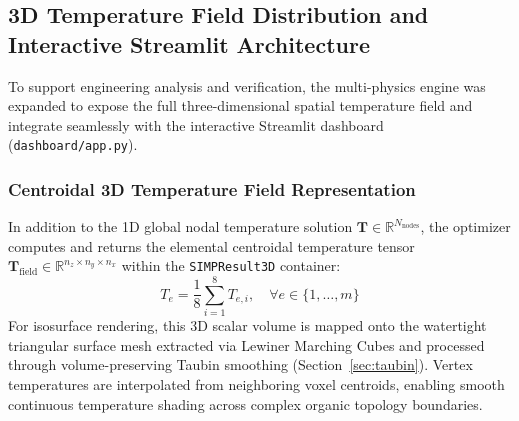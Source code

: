 \documentclass[11pt, a4paper]{article}
\begin{document}
\subsection{3D Temperature Field Distribution and Interactive Streamlit Architecture}
\label{sec:viz_arch}
To support engineering analysis and verification, the multi-physics engine was expanded to expose the full three-dimensional spatial temperature field and integrate seamlessly with the interactive Streamlit dashboard (\texttt{dashboard/app.py}).

\subsubsection{Centroidal 3D Temperature Field Representation}
In addition to the 1D global nodal temperature solution $\mathbf{T} \in \mathbb{R}^{N_{\text{nodes}}}$, the optimizer computes and returns the elemental centroidal temperature tensor $\mathbf{T}_{\text{field}} \in \mathbb{R}^{n_z \times n_y \times n_x}$ within the \texttt{SIMPResult3D} container:
\begin{equation}
T_e = \frac{1}{8} \sum_{i=1}^8 T_{e, i}, \quad \forall e \in \{1, \dots, m\}
\end{equation}
For isosurface rendering, this 3D scalar volume is mapped onto the watertight triangular surface mesh extracted via Lewiner Marching Cubes and processed through volume-preserving Taubin smoothing (Section~\ref{sec:taubin}). Vertex temperatures are interpolated from neighboring voxel centroids, enabling smooth continuous temperature shading across complex organic topology boundaries.
\end{document}
